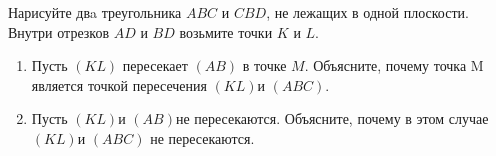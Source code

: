 Нарисуйте двa треугольника $ABC$ и $CBD$, не лежащих в одной плоскости. Внутри отрезков $AD$ и $BD$ возьмите точки $K$ и $L$.

\begin{enumerate}

\item Пусть $(KL)$ пересекает $(AB)$ в точке $M$. Объясните, почему точка M является точкой пересечения $(KL)$и $(ABC)$.
\item Пусть $(KL)$и $(AB)$не пересекаются. Объясните, почему в этом случае $(KL)$и $(ABC)$ не пересекаются.

\end{enumerate}